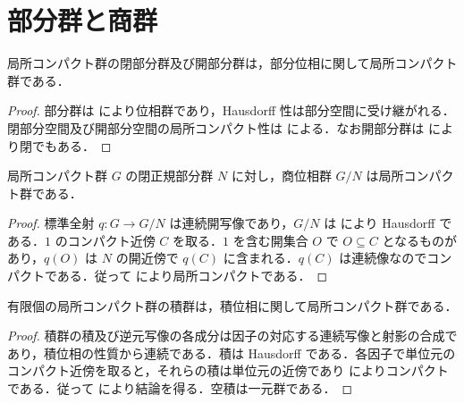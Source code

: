 \section{部分群と商群}
\begin{prop}[閉部分群と開部分群の局所コンパクト性]
局所コンパクト群の閉部分群及び開部分群は，部分位相に関して局所コンパクト群である．
\end{prop}
\begin{proof}
部分群は により位相群であり，Hausdorff 性は部分空間に受け継がれる．閉部分空間及び開部分空間の局所コンパクト性は による．なお開部分群は により閉でもある．
\end{proof}
\begin{prop}[局所コンパクト群の商]
局所コンパクト群 $G$ の閉正規部分群 $N$ に対し，商位相群 $G/N$ は局所コンパクト群である．
\end{prop}
\begin{proof}
標準全射 $q:G\to G/N$ は連続開写像であり，$G/N$ は により Hausdorff である．$1$ のコンパクト近傍 $C$ を取る．$1$ を含む開集合 $O$ で $O\subseteq C$ となるものがあり，$q(O)$ は $N$ の開近傍で $q(C)$ に含まれる．$q(C)$ は連続像なのでコンパクトである．従って により局所コンパクトである．
\end{proof}
\begin{prop}[局所コンパクト群の有限積]
有限個の局所コンパクト群の積群は，積位相に関して局所コンパクト群である．
\end{prop}
\begin{proof}
積群の積及び逆元写像の各成分は因子の対応する連続写像と射影の合成であり，積位相の性質から連続である．積は Hausdorff である．各因子で単位元のコンパクト近傍を取ると，それらの積は単位元の近傍であり によりコンパクトである．従って により結論を得る．空積は一元群である．
\end{proof}
